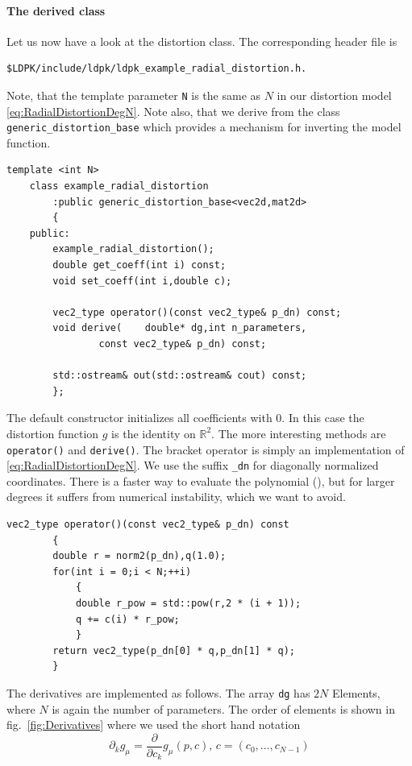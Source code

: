 \documentclass[10pt,a4paper]{article}
\newcommand{\Rpow}[1]{\mathbb{R}^{#1}}
\begin{document}
\paragraph{The derived class}
Let us now have a look at the distortion class. The corresponding header file is
\begin{verbatim}
$LDPK/include/ldpk/ldpk_example_radial_distortion.h.
\end{verbatim}
Note, that the template parameter
{\tt N} is the same as $N$ in our distortion model \eqref{eq:RadialDistortionDegN}.
Note also, that we derive from the class {\tt generic\_distortion\_base} which
provides a mechanism for inverting the model function.
\begin{lstlisting}[language=mycpp,tabsize=8]
	template <int N>
	class example_radial_distortion
		:public generic_distortion_base<vec2d,mat2d>
		{
	public:
		example_radial_distortion();
		double get_coeff(int i) const;
		void set_coeff(int i,double c);

		vec2_type operator()(const vec2_type& p_dn) const;
		void derive(	double* dg,int n_parameters,
				const vec2_type& p_dn) const;

		std::ostream& out(std::ostream& cout) const;
		};
\end{lstlisting}
The default constructor initializes all coefficients with 0. In this case the distortion function
$g$ is the identity on $\Rpow{2}$.
The more interesting methods are {\tt operator()} and {\tt derive()}. The bracket operator is simply an
implementation of \eqref{eq:RadialDistortionDegN}. We use the suffix {\tt \_dn} for diagonally normalized coordinates.
There is a faster way to evaluate the polynomial (\Horner), but for larger degrees it suffers from numerical
instability, which we want to avoid.
\begin{lstlisting}[language=mycpp,tabsize=8]
	vec2_type operator()(const vec2_type& p_dn) const
		{
		double r = norm2(p_dn),q(1.0);
		for(int i = 0;i < N;++i)
			{
			double r_pow = std::pow(r,2 * (i + 1));
			q += c(i) * r_pow;
			}
		return vec2_type(p_dn[0] * q,p_dn[1] * q);
		}
\end{lstlisting}
The derivatives are implemented as follows.
The array {\tt dg} has $2N$ Elements, where $N$ is again the number of parameters.
The order of elements is shown in fig.~\ref{fig:Derivatives}
where we used the short hand notation
\begin{equation}
\partial_k g_\mu = \frac \partial {\partial c_k} g_\mu(p,c) \text{,\ }c=(c_0,\ldots,c_{N-1})
\end{equation}
\end{document}

